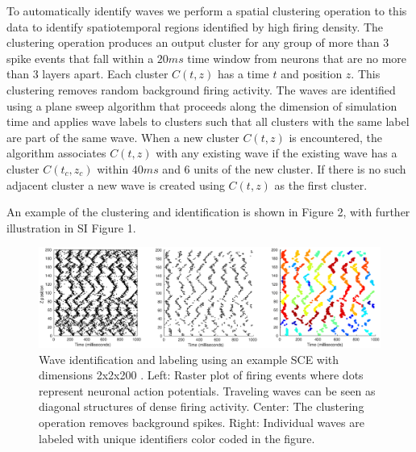 To automatically identify waves we perform a spatial clustering operation to this data to identify spatiotemporal regions identified by high firing density. 
The clustering operation produces an output cluster for any group of more than $3$ spike events that fall within a $20ms$ time window from neurons that are no more than $3$ layers apart.
Each cluster $C(t,z)$ has a time $t$ and position $z$.
This clustering removes random background firing activity. 
The waves are identified using a plane sweep algorithm that proceeds along the dimension of simulation time and applies wave labels to clusters such that all clusters with the same label are part of the same wave.
When a new cluster $C(t,z)$ is encountered, the algorithm associates $C(t,z)$ with any existing wave if the existing wave has a cluster $C(t_c,z_c)$ within $40 ms$ and $6$ units of the new cluster.
If there is no such adjacent cluster a new wave is created using $C(t,z)$ as the first cluster.

An example of the clustering and identification is shown in Figure 2, with further illustration in SI Figure 1.
\begin{figure}[!htb]
  \centering
  \includegraphics[width=\textwidth]{fig/DetectorExample}
  \caption{Wave identification and labeling using an example SCE with dimensions 2x2x200 . Left: Raster plot of firing events where dots represent neuronal action potentials. 
	Traveling waves can be seen as diagonal structures of dense firing activity. 
	Center: The clustering operation removes background spikes. 
	Right: Individual waves are labeled with unique identifiers color coded in the figure.}
  \label{fig:wave_analysis}
\end{figure}


